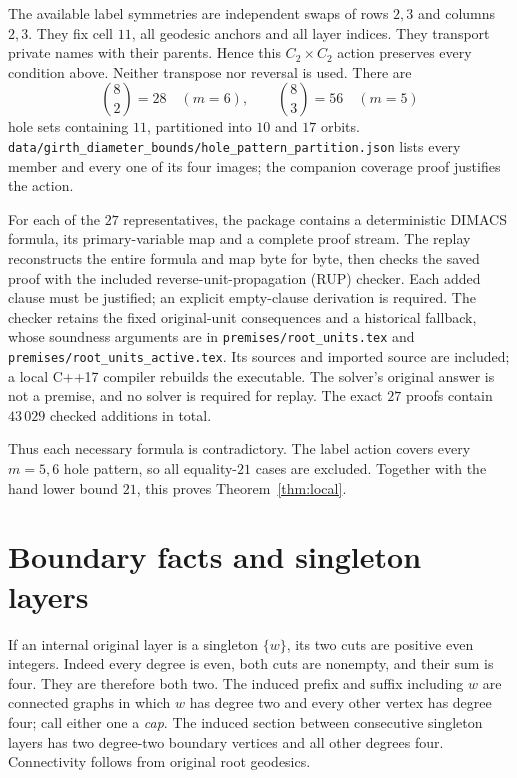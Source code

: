 \documentclass[11pt]{article}
\newcommand{\note}[1]{\nolinkurl{#1}}
\begin{document}
The available label symmetries are independent swaps of rows $2,3$ and
columns $2,3$. They fix cell $11$, all geodesic anchors and all layer
indices. They transport private names with their parents. Hence this
$C_2\times C_2$ action preserves every condition above. Neither transpose
nor reversal is used. There are
\[
 \binom82=28\quad(m=6),\qquad \binom83=56\quad(m=5)
\]
hole sets containing $11$, partitioned into $10$ and $17$ orbits.
\note{data/girth_diameter_bounds/hole_pattern_partition.json} lists every
member and every one of its four images; the companion coverage proof
justifies the action.

For each of the $27$ representatives, the package contains a deterministic
DIMACS formula, its primary-variable map and a complete proof stream.
The replay reconstructs the entire formula and map byte for byte, then
checks the saved proof with the included reverse-unit-propagation (RUP)
checker. Each added clause must be justified; an explicit empty-clause
derivation is required. The checker retains the fixed original-unit
consequences and a historical fallback, whose soundness arguments are
in \note{premises/root_units.tex} and
\note{premises/root_units_active.tex}. Its sources and imported source
are included; a local C++17 compiler rebuilds the executable. The
solver's original answer is not a premise, and no solver is required for
replay. The exact $27$ proofs contain $43\,029$ checked additions in total.

Thus each necessary formula is contradictory. The label action covers
every $m=5,6$ hole pattern, so all equality-$21$ cases are excluded.
Together with the hand lower bound $21$, this proves
Theorem~\ref{thm:local}.

\section{Boundary facts and singleton layers}

If an internal original layer is a singleton $\{w\}$, its two cuts are
positive even integers. Indeed every degree is even, both cuts are
nonempty, and their sum is four. They are therefore both two. The
induced prefix and suffix including $w$ are connected graphs in which
$w$ has degree two and every other vertex has degree four; call either
one a \emph{cap}. The induced section between consecutive singleton
layers has two degree-two boundary vertices and all other degrees four.
Connectivity follows from original root geodesics.
\end{document}
